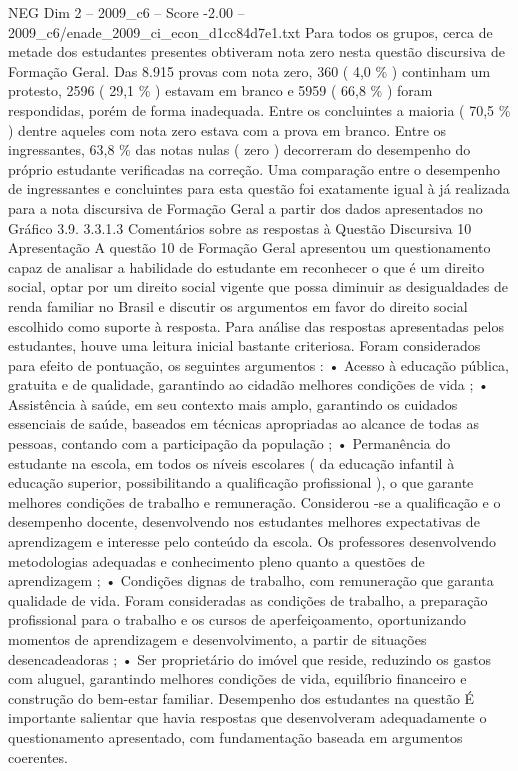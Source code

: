 \begin{textsample}{NEG Dim 2 – 2009\_c6 – Score -2.00 – 2009\_c6/enade\_2009\_ci\_econ\_d1cc84d7e1.txt}
Para todos os grupos, cerca de metade dos estudantes presentes obtiveram nota zero nesta questão discursiva de Formação Geral.
Das 8.915 provas com nota zero, 360 ( 4,0 \% ) continham um protesto, 2596 ( 29,1 \% ) estavam em branco e 5959 ( 66,8 \% ) foram respondidas, porém de forma inadequada.
Entre os concluintes a maioria ( 70,5 \% ) dentre aqueles com nota zero estava com a prova em branco.
Entre os ingressantes, 63,8 \% das notas nulas ( zero ) decorreram do desempenho do próprio estudante verificadas na correção.
Uma comparação entre o desempenho de ingressantes e concluintes para esta questão foi exatamente igual à já realizada para a nota discursiva de Formação Geral a partir dos dados apresentados no Gráfico 3.9. 3.3.1.3 Comentários sobre as respostas à Questão Discursiva 10 Apresentação A questão 10 de Formação Geral apresentou um questionamento capaz de analisar a habilidade do estudante em reconhecer o que é um direito social, optar por um direito social vigente que possa diminuir as desigualdades de renda familiar no Brasil e discutir os argumentos em favor do direito social escolhido como suporte à resposta.
Para análise das respostas apresentadas pelos estudantes, houve uma leitura inicial bastante criteriosa.
Foram considerados para efeito de pontuação, os seguintes argumentos : • Acesso à educação pública, gratuita e de qualidade, garantindo ao cidadão melhores condições de vida ; • Assistência à saúde, em seu contexto mais amplo, garantindo os cuidados essenciais de saúde, baseados em técnicas apropriadas ao alcance de todas as pessoas, contando com a participação da população ; • Permanência do estudante na escola, em todos os níveis escolares ( da educação infantil à educação superior, possibilitando a qualificação profissional ), o que garante melhores condições de trabalho e remuneração.
Considerou -se a qualificação e o desempenho docente, desenvolvendo nos estudantes melhores expectativas de aprendizagem e interesse pelo conteúdo da escola.
Os professores desenvolvendo metodologias adequadas e conhecimento pleno quanto a questões de aprendizagem ; • Condições dignas de trabalho, com remuneração que garanta qualidade de vida.
Foram consideradas as condições de trabalho, a preparação profissional para o trabalho e os cursos de aperfeiçoamento, oportunizando momentos de aprendizagem e desenvolvimento, a partir de situações desencadeadoras ; • Ser proprietário do imóvel que reside, reduzindo os gastos com aluguel, garantindo melhores condições de vida, equilíbrio financeiro e construção do bem-estar familiar.
Desempenho dos estudantes na questão É importante salientar que havia respostas que desenvolveram adequadamente o questionamento apresentado, com fundamentação baseada em argumentos coerentes.

\end{textsample}
